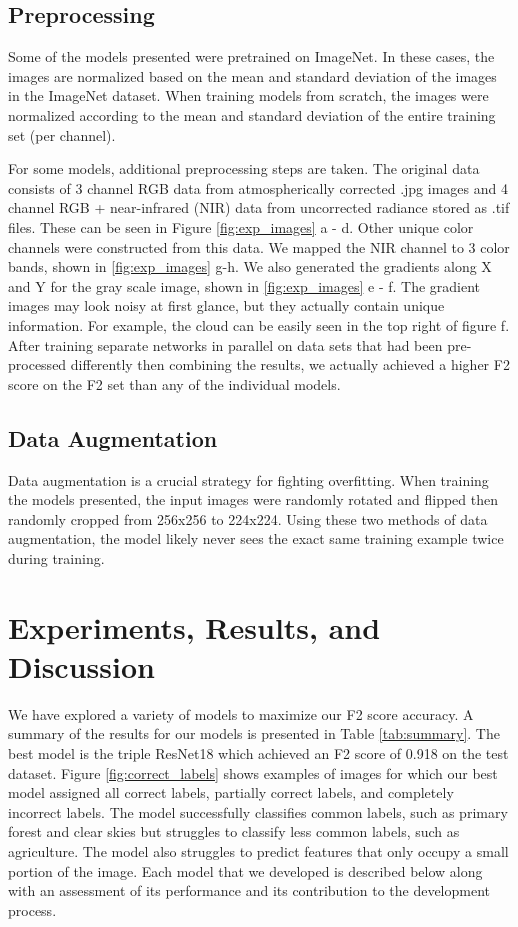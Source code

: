 \documentclass[10pt,twocolumn,letterpaper]{article}
\begin{document}
\subsection*{Preprocessing}
Some of the models presented were pretrained on ImageNet.\cite{imagenet} In these cases, the images are normalized based on the mean and standard deviation of the images in the ImageNet dataset. When training models from scratch, the images were normalized according to the mean and standard deviation of the entire training set (per channel).

For some models, additional preprocessing steps are taken. The original data consists of 3 channel RGB data from atmospherically corrected .jpg images and 4 channel RGB + near-infrared (NIR) data from uncorrected radiance stored as .tif files. These can be seen in Figure \ref{fig:exp_images} a - d. Other unique color channels were constructed from this data. We mapped the NIR channel to 3 color bands, shown in \ref{fig:exp_images} g-h. We also generated the gradients along X and Y for the gray scale image, shown in \ref{fig:exp_images} e - f. The gradient images may look noisy at first glance, but they actually contain unique information. For example, the cloud can be easily seen in the top right of figure f. After training separate networks in parallel on data sets that had been pre-processed differently then combining the results, we actually achieved a higher F2 score on the F2 set than any of the individual models.

\subsection*{Data Augmentation}
Data augmentation is a crucial strategy for fighting overfitting. When training the models presented, the input images were randomly rotated and flipped then randomly cropped from 256x256 to 224x224. Using these two methods of data augmentation, the model likely never sees the exact same training example twice during training.  

\section{Experiments, Results, and Discussion}

We have explored a variety of models to maximize our F2 score accuracy.  A summary of the results for our models is presented in Table \ref{tab:summary}. The best model is the triple ResNet18 which achieved an F2 score of 0.918 on the test dataset. Figure \ref{fig:correct_labels} shows examples of images for which our best model assigned all correct labels, partially correct labels, and completely incorrect labels. The model successfully classifies common labels, such as primary forest and clear skies but struggles to classify less common labels, such as agriculture. The model also struggles to predict features that only occupy a small portion of the image. Each model that we developed is described below along with an assessment of its performance and its contribution to the development process.
\end{document}
